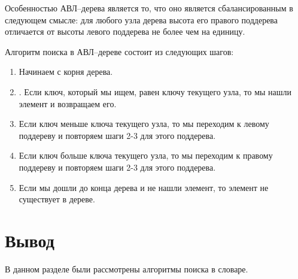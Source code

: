 Особенностью АВЛ--дерева является то, что оно является сбалансированным в следующем смысле: для любого узла дерева высота его правого поддерева отличается от высоты левого поддерева не более чем на единицу.


Алгоритм поиска в АВЛ--дереве состоит из следующих шагов:
\begin{enumerate}
	\item Начинаем с корня дерева.
	\item. Если ключ, который мы ищем, равен ключу текущего узла, то мы нашли элемент и возвращаем его.
	\item Если ключ меньше ключа текущего узла, то мы переходим к левому поддереву и повторяем шаги 2-3 для этого поддерева.
	\item Если ключ больше ключа текущего узла, то мы переходим к правому поддереву и повторяем шаги 2-3 для этого поддерева.
	\item Если мы дошли до конца дерева и не нашли элемент, то элемент не существует в дереве.
\end{enumerate}
\section*{Вывод}

В данном разделе были рассмотрены алгоритмы поиска в словаре.
